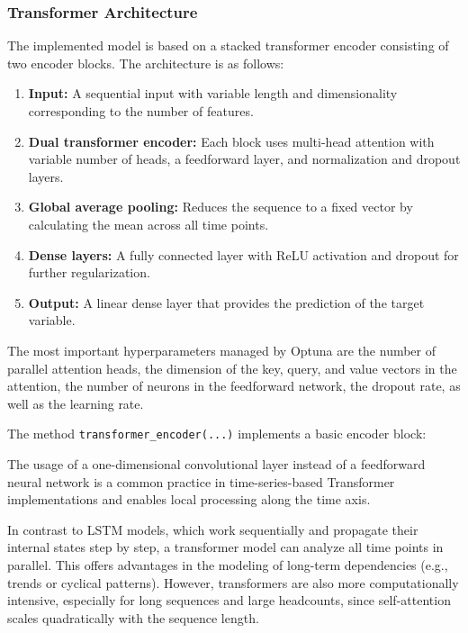 \subsubsection{Transformer Architecture}

The implemented model is based on a stacked transformer encoder consisting of two encoder blocks. The architecture is as follows:

\begin{enumerate}
    \item \textbf{Input:} A sequential input with variable length and dimensionality corresponding to the number of features.

    \item \textbf{Dual transformer encoder:} Each block uses multi-head attention with variable number of heads, a feedforward layer, and normalization and dropout layers.

    \item \textbf{Global average pooling:} Reduces the sequence to a fixed vector by calculating the mean across all time points.

    \item \textbf{Dense layers:} A fully connected layer with ReLU activation and dropout for further regularization.

    \item \textbf{Output:} A linear dense layer that provides the prediction of the target variable.
\end{enumerate}

The most important hyperparameters managed by Optuna are the number of parallel attention heads, the dimension of the key, query, and value vectors in the attention, the number of neurons in the feedforward network, the dropout rate, as well as the learning rate.

The method \verb|transformer_encoder(...)| implements a basic encoder block:



The usage of a one-dimensional convolutional layer instead of a feedforward neural network is a common practice in time-series-based Transformer implementations and enables local processing along the time axis.

In contrast to LSTM models, which work sequentially and propagate their internal states step by step, a transformer model can analyze all time points in parallel. This offers advantages in the modeling of long-term dependencies (e.g., trends or cyclical patterns). However, transformers are also more computationally intensive, especially for long sequences and large headcounts, since self-attention scales quadratically with the sequence length.

